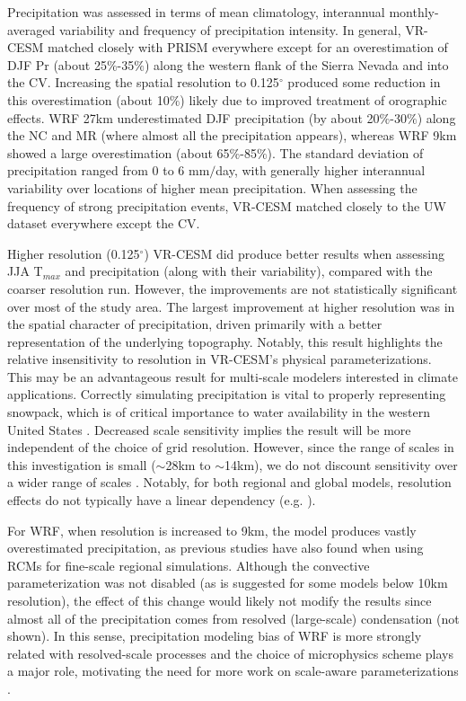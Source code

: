 \documentclass[draft,ms]{agutex}   %
\begin{document}
\begin{article}
Precipitation was assessed in terms of mean climatology, interannual monthly-averaged variability and frequency of precipitation intensity.  In general, VR-CESM matched closely with PRISM everywhere except for an  overestimation of DJF Pr (about 25$\%$-35$\%$) along the western flank of the Sierra Nevada and into the CV. Increasing the spatial resolution to 0.125$^\circ$ produced some reduction in this overestimation (about 10$\%$) likely due to improved treatment of orographic effects. WRF 27km underestimated DJF precipitation (by about 20$\%$-30$\%$) along the NC and MR (where almost all the precipitation appears), whereas WRF 9km showed a large overestimation (about 65$\%$-85$\%$). The standard deviation of precipitation ranged from 0 to 6 mm$/$day, with generally higher interannual variability over locations of higher mean precipitation. When assessing the frequency of strong precipitation events, VR-CESM matched closely to the UW dataset everywhere except the CV.


Higher resolution (0.125$^\circ$) VR-CESM did produce better results when assessing JJA T$_{max}$ and precipitation (along with their variability), compared with the coarser resolution run. However, the improvements are not statistically significant over most of the study area.  The largest improvement at higher resolution was in the spatial character of precipitation, driven primarily with a better representation of the underlying topography. Notably, this result highlights the relative insensitivity to resolution in VR-CESM's physical parameterizations. This may be an advantageous result for multi-scale modelers interested in climate applications. Correctly simulating precipitation is vital to properly representing snowpack, which is of critical importance to water availability in the western United States \citep{bales2006mountain, wise2012hydroclimatology, Rhoades2015Characterizing}. Decreased scale sensitivity implies the result will be more independent of the choice of grid resolution. However, since the range of scales in this investigation is small ($\sim$28km to $\sim$14km), we do not discount sensitivity over a wider range of scales \citep{wehner2010effect, rauscher2010resolution}. Notably, for both regional and global models, resolution effects do not typically have a linear dependency (e.g. \cite{hughes2014landfall, wehner2014effect}).

For WRF, when resolution is increased to 9km, the model produces vastly overestimated precipitation, as previous studies have also found when using RCMs for fine-scale regional simulations. Although the convective parameterization was not disabled (as is suggested for some models below 10km resolution), the effect of this change would likely not modify the results since almost all of the precipitation comes from resolved (large-scale) condensation (not shown). In this sense, precipitation modeling bias of WRF is more strongly related with resolved-scale processes and the choice of microphysics scheme plays a major role, motivating the need for more work on scale-aware parameterizations \citep{o2013observed}. 


\end{article}
\end{document}
